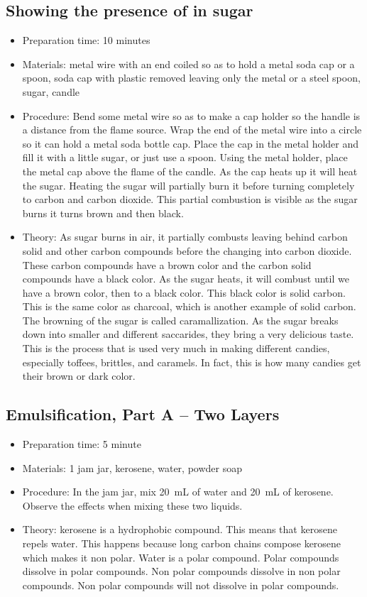 \subsection{Showing the presence of \texorpdfstring{}{C} in sugar}
\begin{itemize}
\item{Preparation time: 10 minutes}
\item{Materials: metal wire with an end coiled so as to hold a metal soda cap or a spoon, soda cap with plastic removed leaving only the metal or a steel spoon, sugar, candle}
\item{Procedure: Bend some metal wire so as to make a cap holder so the handle is a distance from the flame source. Wrap the end of the metal wire into a circle so it can hold a metal soda bottle cap. Place the cap in the metal holder and fill it with a little sugar, or just use a spoon. Using the metal holder, place the metal cap above the flame of the candle. As the cap heats up it will heat the sugar. Heating the sugar will partially burn it before turning completely to carbon and carbon dioxide. This partial combustion is visible as the sugar burns it turns brown and then black.}
\item{Theory:  As sugar burns in air, it partially combusts leaving behind carbon solid and other carbon compounds before the changing into carbon dioxide. These carbon compounds have a brown color and the carbon solid compounds have a black color. As the sugar heats, it will combust until we have a brown color, then to a black color. This black color is solid carbon. This is the same color as charcoal, which is another example of solid carbon. The browning of the sugar is called caramallization. As the sugar breaks down into smaller and different saccarides, they bring a very delicious taste. This is the process that is used very much in making different candies, especially toffees, brittles, and caramels. In fact, this is how many candies get their brown or dark color.}
\end{itemize}

\subsection{Emulsification, Part A -- Two Layers}
\begin{itemize}
\item{Preparation time: 5 minute}
\item{Materials: 1 jam jar, kerosene, water, powder soap}
\item{Procedure: In the jam jar, mix 20~mL of water and 20~mL of kerosene. Observe the effects when mixing these two liquids.}
\item{Theory: kerosene is a hydrophobic compound. This means that kerosene repels water. This happens because long carbon chains compose kerosene which makes it non polar. Water is a polar compound. Polar compounds dissolve in polar compounds. Non polar compounds dissolve in non polar compounds. Non polar compounds will not dissolve in polar compounds.}
\end{itemize}

